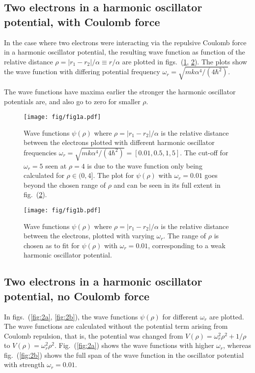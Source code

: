 \documentclass[a4paper,11pt]{article}
\begin{document}
\subsection{Two electrons in a harmonic oscillator potential, with Coulomb force}
In the case where two electrons were interacting via the repulsive Coulomb force in a harmonic oscillator potential, the resulting wave function as function of the relative distance $\rho = |r_1 - r_2|/\alpha \equiv r/\alpha$ are plotted in figs.~(\ref{fig:1a}, \ref{fig:1b}). The plots show the wave function with differing potential frequency $\omega_r = \sqrt{mk \alpha^4/(4 \hbar^2)}$. 

The wave functions have maxima earlier the stronger the harmonic oscillator potentials are, and also go to zero for smaller $\rho$.

\begin{figure}[htb]
    \centering
    \texttt{[image: fig/fig1a.pdf]}
    \caption{Wave functions $\psi(\rho)$ where $\rho = |r_1 - r_2|/\alpha$ is the relative distance between the electrons plotted with different harmonic oscillator frequencies $\omega_r = \sqrt{mk \alpha^4/(4 \hbar^2)} = [0.01, 0.5, 1, 5]$. The cut-off for $\omega_r = 5$ seen at $\rho=4$ is due to the wave function only being calculated for $\rho \in (0,4]$. The plot for $\psi(\rho)$ with $\omega_r = 0.01$ goes beyond the chosen range of $\rho$ and can be seen in its full extent in fig.~(\ref{fig:1b}).  }
    \label{fig:1a}
\end{figure}

\begin{figure}[htb]
    \centering
    \texttt{[image: fig/fig1b.pdf]}
    \caption{Wave functions $\psi(\rho)$ where $\rho = |r_1 - r_2|/\alpha$ is the relative distance between the electrons, plotted with varying $\omega_r$. The range of $\rho$ is chosen as to fit for $\psi(\rho)$ with $\omega_r = 0.01$, corresponding to a weak harmonic oscillator potential.}
    \label{fig:1b}
\end{figure}

\subsection{Two electrons in a harmonic oscillator potential, no Coulomb force}
In figs.~(\ref{fig:2a}, \ref{fig:2b}), the wave functions $\psi(\rho)$ for different $\omega_r$ are plotted. The wave functions are calculated without the potential term arising from Coulomb repulsion, that is, the potential was changed from $V(\rho) = \omega^2_r \rho^2 + 1/\rho$ to $V(\rho) = \omega^2_r \rho^2$. Fig.~(\ref{fig:2a}) shows the wave functions with higher $\omega_r$, whereas fig.~(\ref{fig:2b}) shows the full span of the wave function in the oscillator potential with strength $\omega_r = 0.01$. 
\end{document}
